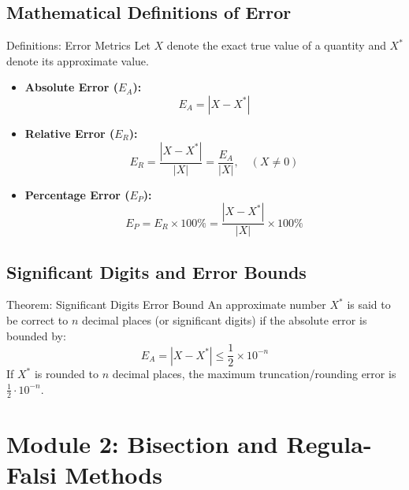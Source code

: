 \documentclass[11pt,a4paper]{article}
\begin{document}
\subsection{Mathematical Definitions of Error}

\begin{defbox}{Definitions: Error Metrics}
Let $X$ denote the exact true value of a quantity and $X^*$ denote its approximate value.
\begin{itemize}
    \item \textbf{Absolute Error ($E_A$):}
    \begin{equation}
        E_A = |X - X^*|
    \end{equation}
    
    \item \textbf{Relative Error ($E_R$):}
    \begin{equation}
        E_R = \frac{|X - X^*|}{|X|} = \frac{E_A}{|X|}, \quad (X \neq 0)
    \end{equation}
    
    \item \textbf{Percentage Error ($E_P$):}
    \begin{equation}
        E_P = E_R \times 100\% = \frac{|X - X^*|}{|X|} \times 100\%
    \end{equation}
\end{itemize}
\end{defbox}

\subsection{Significant Digits and Error Bounds}

\begin{formulabox}{Theorem: Significant Digits Error Bound}
An approximate number $X^*$ is said to be correct to $n$ decimal places (or significant digits) if the absolute error is bounded by:
\begin{equation}
    E_A = |X - X^*| \le \frac{1}{2} \times 10^{-n}
\end{equation}
If $X^*$ is rounded to $n$ decimal places, the maximum truncation/rounding error is $\frac{1}{2} \cdot 10^{-n}$.
\end{formulabox}

\newpage

\section{Module 2: Bisection and Regula-Falsi Methods}
\end{document}

